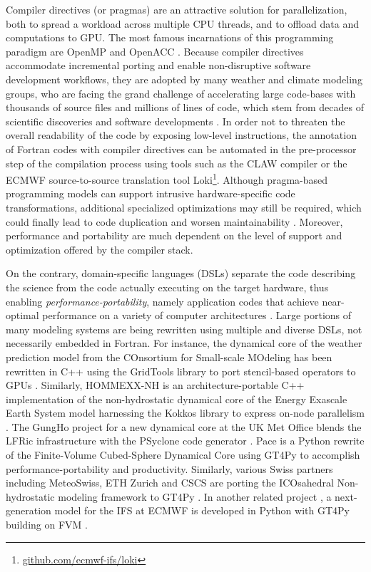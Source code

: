 \documentclass[main.tex]{subfiles}
\begin{document}
        Compiler directives (or pragmas) are an attractive solution for parallelization, both to spread a workload across multiple CPU threads, and to offload data and computations to GPU. The most famous incarnations of this programming paradigm are OpenMP \citep{dagum98} and OpenACC \citep{chandrasekaran17}. Because compiler directives accommodate incremental porting and enable non-disruptive software development workflows, they are adopted by many weather and climate modeling groups, who are facing the grand challenge of accelerating large code-bases with thousands of source files and millions of lines of code, which stem from decades of scientific discoveries and software developments \citep{lapillonne17, lapillonne20, randall22}. In order not to threaten the overall readability of the code by exposing low-level instructions, the annotation of Fortran codes with compiler directives can be automated in the pre-processor step of the compilation process using tools such as the CLAW compiler \citep{clement19} or the ECMWF source-to-source translation tool Loki\footnote{\url{github.com/ecmwf-ifs/loki}}. Although pragma-based programming models can support intrusive hardware-specific code transformations, additional specialized optimizations may still be required, which could finally lead to code duplication and worsen maintainability \citep{dahm23}. Moreover, performance and portability are much dependent on the level of support and optimization offered by the compiler stack.

        On the contrary, domain-specific languages (DSLs) separate the code describing the science from the code actually executing on the target hardware, thus enabling \emph{performance-portability}, namely application codes that achieve near-optimal performance on a variety of computer architectures \citep{deakin19}. Large portions of many modeling systems are being rewritten using multiple and diverse DSLs, not necessarily embedded in Fortran. For instance, the dynamical core of the weather prediction model from the COnsortium for Small-scale MOdeling \citep[COSMO;][]{baldauf11} has been rewritten in C++ using the GridTools library \citep{afanasyev21} to port stencil-based operators to GPUs \citep{fuhrer14, fuhrer18}. Similarly, HOMMEXX-NH \citep{bertagna20} is an architecture-portable C++ implementation of the non-hydrostatic dynamical core of the Energy Exascale Earth System model \citep[E3SM;][]{taylor20} harnessing the Kokkos library to express on-node parallelism \citep{edwards14}. The GungHo project for a new dynamical core at the UK Met Office blends the LFRic infrastructure with the PSyclone code generator \citep{adams19}. Pace \citep{ben-nun22, dahm23} is a Python rewrite of the Finite-Volume Cubed-Sphere Dynamical Core \citep[FV3;][]{harris13} using GT4Py to accomplish performance-portability and productivity. Similarly, various Swiss partners including MeteoSwiss, ETH Zurich and CSCS are porting the ICOsahedral Non-hydrostatic modeling framework \citep[ICON;][]{zangl15} to GT4Py \citep{luz24}. In another related project \citep{kuhnlein23}, a next-generation model for the IFS at ECMWF is developed in Python with GT4Py building on FVM \citep{smolarkiewicz16, kuehnlein19}.
\end{document}
